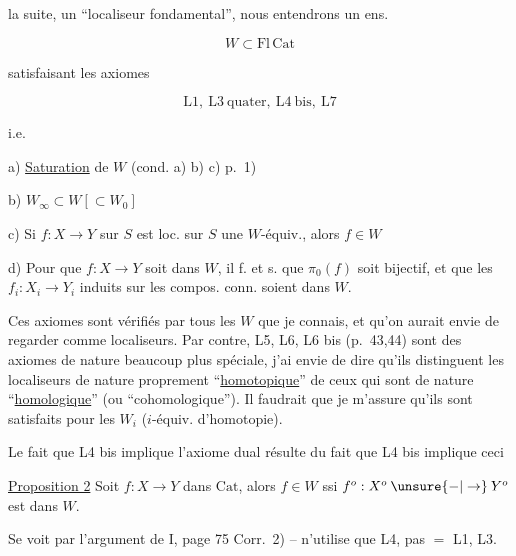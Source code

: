  la suite,  un ``localiseur fondamental'', nous entendrons un ens.

\[
 W\subset\mathrm{Fl}\,\mathrm{Cat}
\]

satisfaisant  les axiomes

\[
 \mathrm L1,\ \mathrm L3\ \text{quater},\ \mathrm L4\ \text{bis},\ \mathrm L7
\]

i.e. 

\noindent\begin{minipage}{.035\linewidth}
\end{minipage}\begin{minipage}{.93\linewidth}
a) \uline{Saturation} de $W$ (cond. a) b) c) p.~1)

b) $W_\infty\subset W[\subset W_0]$

c) Si $f:X\longrightarrow Y$ sur $S$ est loc. sur $S$ une $W$-équiv., alors $f\in W$ 

d) Pour que $f:X\longrightarrow Y$ soit dans $W$, il f. et s. que $\pi_0(f)$ soit bijectif, et que les $f_i:X_i\longrightarrow Y_i$ induits sur les compos. conn. soient dans $W$.
\end{minipage}



 Ces axiomes sont vérifiés par tous les $W$ que je connais, et qu'on aurait envie de regarder comme localiseurs. Par contre, L5, L6, L6 bis (p.~43,44) sont des axiomes de nature beaucoup plus spéciale, j'ai envie de dire qu'ils distinguent les localiseurs de nature proprement ``\uline{homotopique}'' de ceux qui sont de nature ``\uline{homologique}'' (ou ``cohomologique''). Il faudrait que je m'assure qu'ils sont satisfaits pour les $W_i$ ($i$-équiv. d'homotopie).


Le fait que L4 bis  implique l'axiome dual résulte du fait  que L4 bis implique ceci

\uline{Proposition 2} Soit $f:X\longrightarrow Y$ dans $\mathrm{Cat}$, alors $f\in W$ ssi $f^o:X^o\mathbin{\unsure{-|\to}}Y^o$ est dans $W$.

Se voit par l'argument de I, page 75 Corr.~2) -- n'utilise que L4, pas $=$ L1, L3.

